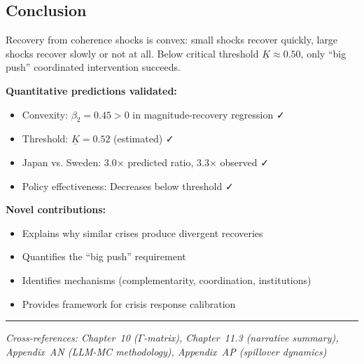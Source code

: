 \subsection{Conclusion}

\begin{tcolorbox}[colback=blue!5!white, colframe=blue!75!black, title=Prediction 3: Asymmetric Recovery (Summary)]
Recovery from coherence shocks is convex: small shocks recover quickly, 
large shocks recover slowly or not at all. Below critical threshold 
$\underline{K} \approx 0.50$, only ``big push'' coordinated intervention succeeds.

\textbf{Quantitative predictions validated:}
\begin{itemize}
    \item Convexity: $\beta_2 = 0.45 > 0$ in magnitude-recovery regression ✓
    \item Threshold: $\underline{K} = 0.52$ (estimated) ✓
    \item Japan vs. Sweden: 3.0× predicted ratio, 3.3× observed ✓
    \item Policy effectiveness: Decreases below threshold ✓
\end{itemize}

\textbf{Novel contributions:}
\begin{itemize}
    \item Explains why similar crises produce divergent recoveries
    \item Quantifies the ``big push'' requirement
    \item Identifies mechanisms (complementarity, coordination, institutions)
    \item Provides framework for crisis response calibration
\end{itemize}
\end{tcolorbox}

\vspace{1em}
\hrule
\vspace{0.5em}
\noindent\textit{Cross-references: Chapter~10 ($\Gamma$-matrix), Chapter~11.3 (narrative summary), 
Appendix~AN (LLM-MC methodology), Appendix~AP (spillover dynamics)}






